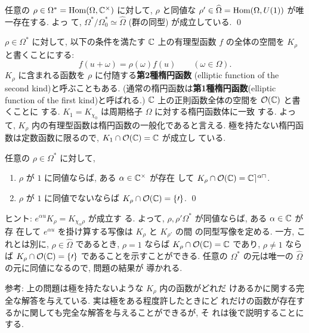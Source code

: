 \documentclass[12pt,twoside]{jarticle}
\def\O{\cal{O}}
\def\Omegahat{\widehat\Omega}
\def\Hom{\mathop{\text{\rm Hom}}\nolimits}
\def\C{{\Bbb C}} %
\begin{document}
\begin{question}
  任意の $\rho\in\Omega^*=\Hom(\Omega,\C^{\times})$ に対して, $\rho$ 
  と同値な $\rho'\in\Omegahat=\Hom(\Omega,U(1))$ が唯一存在する. よっ
  て, $\Omega^*/\Omega^*_0\simeq\Omegahat$ (群の同型) が成立している.
  \qed
\end{question}

$\rho\in\Omega^*$ に対して, 以下の条件を満たす $\C$ 上の有理型函数 $f$ 
の全体の空間を $K_\rho$ と書くことにする:
\[
  f(u+\omega) = \rho(\omega)f(u)
  \qquad
  (\omega\in\Omega).
\] %
$K_\rho$ に含まれる函数を $\rho$ に付随する{\bf 第2種楕円函数}
(elliptic function of the second kind)と呼ぶこともある. %
(通常の楕円函数は{\bf 第1種楕円函数}(elliptic function of the first
kind)と呼ばれる.)  $\C$ 上の正則函数全体の空間を $\O(\C)$ と書くことに
する. $K_1=K_{\chi_0}$ は周期格子 $\Omega$ に対する楕円函数体に一致
する. よって, $K_\rho$ 内の有理型函数は楕円函数の一般化であると言える. 
極を持たない楕円函数は定数函数に限るので, $K_1\cap\O(\C)=\C$ が成立し
ている.

\begin{question}
  任意の $\rho\in\Omega^*$ に対して,
  \begin{enumerate}
  \item $\rho$ が $1$ に同値ならば, ある $\alpha\in\C^{\times}$ が存在
    して $K_\rho\cap\O(\C) = \C e^{\alpha u}$.
  \item $\rho$ が $1$ に同値でないならば $K_\rho\cap\O(\C)=\{0\}$. \qed
  \end{enumerate}
\end{question}

\noindent ヒント: $e^{\alpha u}K_\rho = K_{\chi_\alpha\rho}$ が成立す
る. よって, $\rho,\rho'\Omega^*$ が同値ならば, ある $\alpha\in\C$ が存
在して $e^{\alpha u}$ を掛け算する写像は $K_\rho$ と $K_{\rho'}$ の間
の同型写像を定める. 一方, これとは別に, $\rho\in\Omegahat$ であるとき, %
$\rho=1$ ならば $K_\rho\cap\O(\C)=\C$ であり, $\rho\ne1$ ならば %
$K_\rho\cap\O(\C)=\{0\}$ であることを示すことができる. 任意の %
$\Omega^*$ の元は唯一の $\Omegahat$ の元に同値になるので, 問題の結果が
導かれる.

\medskip

\noindent 参考: 上の問題は極を持たないような $K_\rho$ 内の函数がどれだ
けあるかに関する完全な解答を与えている. 実は極をある程度許したときにど
れだけの函数が存在するかに関しても完全な解答を与えることができるが, そ
れは後で説明することにする.

\medskip
\end{document}
